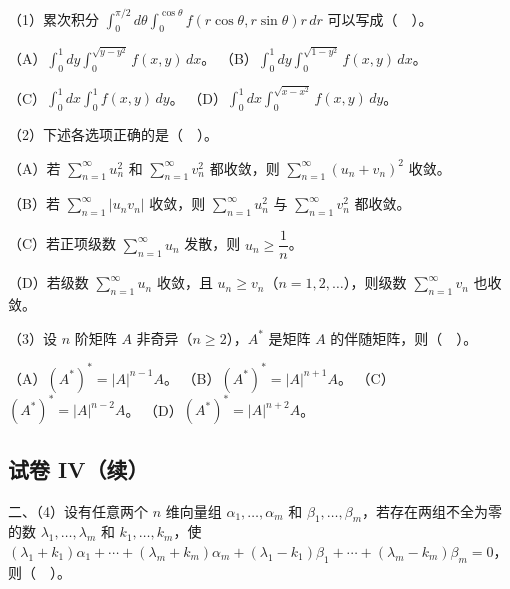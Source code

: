 \documentclass[UTF8,12pt]{ctexart}
\begin{document}
（1）累次积分 \(\displaystyle \int_0^{\pi/2}d\theta\displaystyle \int_0^{\cos\theta}f(r\cos\theta,\allowbreak r\sin\theta)r\,dr\) 可以写成（　）。


（A）\(\displaystyle \int_0^1dy\displaystyle \int_0^{\sqrt{y-y^2}}f(x,\allowbreak y)\,dx\)。 （B）\(\displaystyle \int_0^1dy\displaystyle \int_0^{\sqrt{1-y^2}}f(x,\allowbreak y)\,dx\)。


（C）\(\displaystyle \int_0^1dx\displaystyle \int_0^1f(x,\allowbreak y)\,dy\)。 （D）\(\displaystyle \int_0^1dx\displaystyle \int_0^{\sqrt{x-x^2}}f(x,\allowbreak y)\,dy\)。


（2）下述各选项正确的是（　）。


（A）若 \(\displaystyle \sum_{n=1}^{\infty}u_n^2\) 和 \(\displaystyle \sum_{n=1}^{\infty}v_n^2\) 都收敛，则 \(\displaystyle \sum_{n=1}^{\infty}(u_n+v_n)^2\) 收敛。


（B）若 \(\displaystyle \sum_{n=1}^{\infty}|u_nv_n|\) 收敛，则 \(\displaystyle \sum_{n=1}^{\infty}u_n^2\) 与 \(\displaystyle \sum_{n=1}^{\infty}v_n^2\) 都收敛。


（C）若正项级数 \(\displaystyle \sum_{n=1}^{\infty}u_n\) 发散，则 \(\displaystyle u_n\geq\dfrac{\displaystyle 1}{\displaystyle n}\)。


（D）若级数 \(\displaystyle \sum_{n=1}^{\infty}u_n\) 收敛，且 \(\displaystyle u_n\geq v_n\)（\(\displaystyle n=1,\allowbreak 2,\allowbreak \ldots\)），则级数 \(\displaystyle \sum_{n=1}^{\infty}v_n\) 也收敛。


（3）设 \(\displaystyle n\) 阶矩阵 \(\displaystyle A\) 非奇异（\(\displaystyle n\geq2\)），\(\displaystyle A^*\) 是矩阵 \(\displaystyle A\) 的伴随矩阵，则（　）。


（A）\(\displaystyle (A^*)^*=|A|^{n-1}A\)。 （B）\(\displaystyle (A^*)^*=|A|^{n+1}A\)。 （C）\(\displaystyle (A^*)^*=|A|^{n-2}A\)。 （D）\(\displaystyle (A^*)^*=|A|^{n+2}A\)。


\subsection*{试卷 IV（续）}

二、（4）设有任意两个 \(\displaystyle n\) 维向量组 \(\displaystyle \alpha_1,\allowbreak \ldots,\allowbreak \alpha_m\) 和 \(\displaystyle \beta_1,\allowbreak \ldots,\allowbreak \beta_m\)，若存在两组不全为零的数 \(\displaystyle \lambda_1,\allowbreak \ldots,\allowbreak \lambda_m\) 和 \(\displaystyle k_1,\allowbreak \ldots,\allowbreak k_m\)，使 \(\displaystyle (\lambda_1+k_1)\alpha_1+\cdots+(\lambda_m+k_m)\alpha_m+(\lambda_1-k_1)\beta_1+\cdots+(\lambda_m-k_m)\beta_m=0\)，则（　）。
\end{document}
